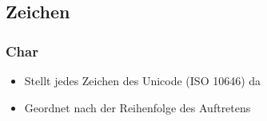 \documentclass[fleqn,11pt,aspectratio=43]{beamer}
\begin{document}
\subsection{Zeichen}
\begin{frame}
\frametitle{Char}
\begin{block}{\vspace*{-2ex}}
\begin{itemize}
  \item Stellt jedes Zeichen des Unicode (ISO 10646) da
  \item Geordnet nach der Reihenfolge des Auftretens
\end{itemize}
\end{block}
\end{frame}


\end{document}
